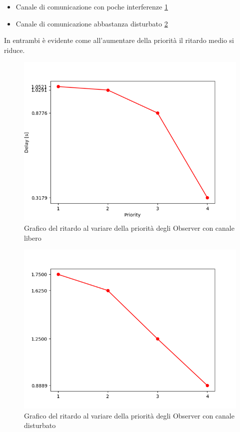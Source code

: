     \begin{itemize}
      \item Canale di comunicazione con poche interferenze \ref{fig:graficoRitardoLibero}
      \item Canale di comunicazione abbastanza disturbato \ref{fig:graficoRitardoDisturbato}
    \end{itemize}
    In entrambi è evidente come all'aumentare della priorità il ritardo medio si riduce.
    \begin{figure}
      \includegraphics[width=\linewidth]{../Immagini/GraficoRitardoLibero.png}
      \caption{Grafico del ritardo al variare della priorità degli Observer con canale libero}
      \label{fig:graficoRitardoLibero}
    \end{figure}
    \begin{figure}
      \includegraphics[width=\linewidth]{../Immagini/GraficoRitardoDisturbato.png}
      \caption{Grafico del ritardo al variare della priorità degli Observer con canale disturbato}
      \label{fig:graficoRitardoDisturbato}
    \end{figure}
